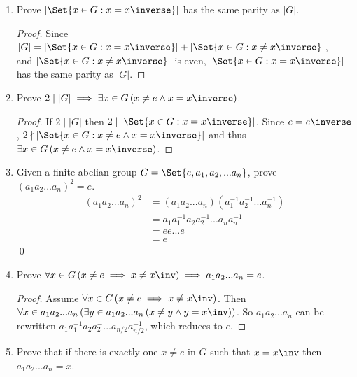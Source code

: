 \begin{enumerate}[label={\Alph*.},font={\bfseries}]
\begin{enumerate}[label={\arabic*},font={\bfseries}]
\begin{proof}
      Therefore, $\forall x \in G\left(x = x\inverse \lor \left(x \ne x\inverse \land \exists y \in G\left(y \ne x \land y = x\inverse\right)\right)\right)$.

      So, $\left|\Set{x \in G : x \ne x\inverse}\right| = \left|\Set{x_0,x_0\inverse,x_1,x_1\inverse,x_2,x_2\inverse,x_3,x_3\inverse...}\right| = 2k$.
    \end{proof}
  \item Prove $\left|\Set{x \in G : x = x\inverse}\right|$ has the same parity as $|G|$.
    \begin{proof}
      Since $|G| = \left|\Set{x \in G : x = x\inverse}\right| + \left|\Set{x \in G : x \ne x\inverse}\right|$, \\
      and $\left|\Set{x \in G : x \ne x\inverse}\right|$ is even, $\left|\Set{x \in G : x = x\inverse}\right|$ has the same parity as $|G|$.
    \end{proof}
  \item Prove $2 \mid |G| \implies \exists x \in G\left(x \ne e \land x = x\inverse \right)$.
    \begin{proof}
      If $2 \mid |G|$ then $2 \mid \left|\Set{x \in G : x = x\inverse}\right|$. Since $e = e\inverse$, $2 \nmid \left|\Set{x \in G : x \ne e \land x = x\inverse}\right|$ and thus $\exists x \in G\left(x \ne e \land x = x\inverse\right)$.
    \end{proof}
  \item Given a finite abelian group $G = \Set{e,a_1,a_2,...a_n}$, prove $(a_1a_2...a_n)^2 = e$.
    \begin{align*}
      (a_1a_2...a_n)^2 &= (a_1a_2...a_n)(a_1^{-1}a_2^{-1}...a_n^{-1}) \\
      &= a_1a_1^{-1}a_2a_2^{-1}...a_na_n^{-1} \\
      &= ee...e \\
      &= e
    \end{align*}
    \qed
  \item Prove $\forall x \in G\left(x \ne e \implies x \ne x\inv\right) \implies a_1a_2...a_n = e$.
    \begin{proof}
      Assume $\forall x \in G\left(x \ne e \implies x \ne x\inv\right)$.
      Then $\forall x \in a_1a_2...a_n\left(\exists y \in a_1a_2...a_n\left(x \ne y \land y = x\inv\right)\right)$.
      So $a_1a_2...a_n$ can be rewritten $a_1a_1^{-1}a_2a_2^{-}...a_{n/2}a_{n/2}^{-1}$, which reduces to $e$.
    \end{proof}
  \item Prove that if there is exactly one $x \ne e$ in $G$ such that $x = x\inv$ then $a_1a_2...a_n = x$.

\end{enumerate}
\end{enumerate}
